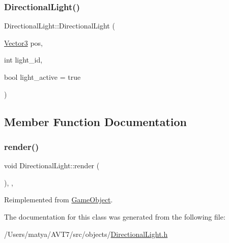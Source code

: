 \subsubsection{\texorpdfstring{Directional\+Light()}{DirectionalLight()}}
{\footnotesize\ttfamily Directional\+Light\+::\+Directional\+Light (\begin{DoxyParamCaption}\item[{\hyperlink{class_vector3}{Vector3}}]{pos,  }\item[{int}]{light\+\_\+id,  }\item[{bool}]{light\+\_\+active = {\ttfamily true} }\end{DoxyParamCaption})\hspace{0.3cm}{\ttfamily [inline]}}



\subsection{Member Function Documentation}
\mbox{\label{class_directional_light_aa56c9af208dd1bc66967d219297b6e67}} 
\subsubsection{\texorpdfstring{render()}{render()}}
{\footnotesize\ttfamily void Directional\+Light\+::render (\begin{DoxyParamCaption}{ }\end{DoxyParamCaption})\hspace{0.3cm}{\ttfamily [inline]}, {\ttfamily [final]}, {\ttfamily [virtual]}}



Reimplemented from \hyperlink{class_game_object_a484efb66a7a27c101e84c11d9905d7a6}{Game\+Object}.



The documentation for this class was generated from the following file\+:\begin{DoxyCompactItemize}
\item 
/\+Users/matya/\+A\+V\+T7/src/objects/\hyperlink{_directional_light_8h}{Directional\+Light.\+h}\end{DoxyCompactItemize}
